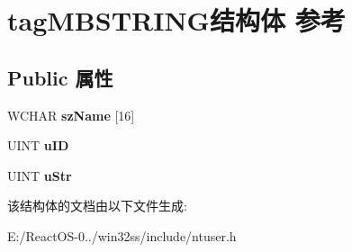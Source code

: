 \hypertarget{structtag_m_b_s_t_r_i_n_g}{}\section{tag\+M\+B\+S\+T\+R\+I\+N\+G结构体 参考}
\label{structtag_m_b_s_t_r_i_n_g}
\subsection*{Public 属性}
\begin{DoxyCompactItemize}
\item 
\mbox{\label{structtag_m_b_s_t_r_i_n_g_af013f2fbed86ecf87a1a0e64c88de248}} 
W\+C\+H\+AR {\bfseries sz\+Name} \mbox{[}16\mbox{]}
\item 
\mbox{\label{structtag_m_b_s_t_r_i_n_g_a38f54da00cbdabac6a4b3101873340aa}} 
U\+I\+NT {\bfseries u\+ID}
\item 
\mbox{\label{structtag_m_b_s_t_r_i_n_g_a1e53a4a27054852eeea25b6eb075b4c6}} 
U\+I\+NT {\bfseries u\+Str}
\end{DoxyCompactItemize}


该结构体的文档由以下文件生成\+:\begin{DoxyCompactItemize}
\item 
E\+:/\+React\+O\+S-\/0../win32ss/include/ntuser.\+h\end{DoxyCompactItemize}
